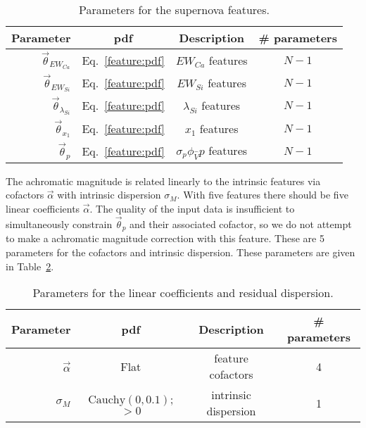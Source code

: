 \documentclass{aastex61}   	%
\begin{document}
\begin{table}
\begin{center}
\caption{Parameters for the supernova features.\label{feature:tab}}
\begin{tabular}{rccc}
\hline
Parameter & pdf & Description & \# parameters\\ \hline
$\vec{\theta}_{EW_{Ca}}$ & Eq.~\ref{feature:pdf} & ${EW}_{Ca}$ features & $N-1$ \\
$\vec{\theta}_{EW_{Si}}$ & Eq.~\ref{feature:pdf}& ${EW}_{Si}$ features & $N-1$ \\
$\vec{\theta}_{\lambda_{Si}}$ &Eq.~\ref{feature:pdf}& ${\lambda}_{Si}$ features & $N-1$ \\
$\vec{\theta}_{x_1}$ & Eq.~\ref{feature:pdf}& ${x}_{1}$ features & $N-1$ \\
$\vec{\theta}_{p}$ & Eq.~\ref{feature:pdf}& $\sigma_p\phi_{\hat{V}}  {p} $ features & $N-1$ \\
\hline
\end{tabular}
\end{center}
\end{table}

The achromatic magnitude is related linearly to the intrinsic features via
cofactors $\vec{\alpha}$ with intrinsic dispersion $\sigma_M$.
With five features there should be five linear coefficients $\vec{\alpha}$.  The quality of the input data is insufficient to
simultaneously constrain $\vec{\theta}_p$ and their associated cofactor, so we do not attempt to make a achromatic magnitude
correction with this feature.
These are 5 parameters for the cofactors and intrinsic dispersion.  These parameters are given in Table~\ref{mag:tab}.  

\begin{table}
\begin{center}
\caption{Parameters for the linear coefficients and residual dispersion.\label{mag:tab}}
\begin{tabular}{rccc}
\hline
Parameter & pdf & Description & \# parameters\\ \hline
$\vec{\alpha}$ & Flat& feature cofactors & 4 \\
$\sigma_M$ & $\text{Cauchy}(0, 0.1)$; $>0$ & intrinsic dispersion & 1\\
\hline
\end{tabular}
\end{center}
\end{table}
\end{document}
